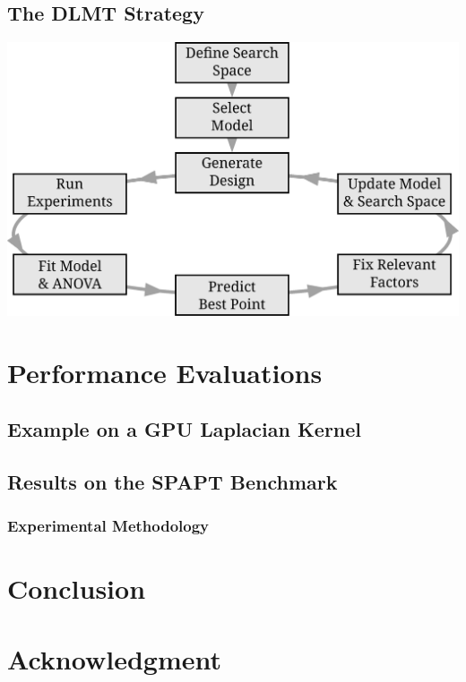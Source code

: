 \documentclass[conference]{IEEEtran}
\begin{document}
\subsection{The DLMT Strategy}
\label{sec:orge3c5fe6}
\begin{center}
\begin{center}
\includegraphics[width=.8\columnwidth]{./img/doe_anova_strategy.eps}
\end{center}
\end{center}

\section{Performance Evaluations}
\label{sec:org75da549}
\subsection{Example on a GPU Laplacian Kernel}
\label{sec:org46366b2}
\subsection{Results on the SPAPT Benchmark}
\label{sec:org4af1fd7}
\subsubsection{Experimental Methodology}
\label{sec:org05faa84}
\section{Conclusion}
\label{sec:org75230fa}
\section*{Acknowledgment}
\label{sec:org1d70f6b}


\end{document}
